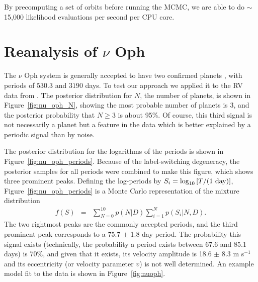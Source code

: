 \documentclass[useAMS,usenatbib]{mn2e}
\begin{document}
By precomputing a set of orbits before running the MCMC, we are able to
do $\sim$ 15,000 likelihood evaluations per second per CPU core.

\section{Reanalysis of $\nu$ Oph}
The $\nu$ Oph system is generally accepted to have two confirmed planets
\citep[e.g.][]{2011AIPC.1331..102Q, 2012PASJ...64..135S, fengji}, with periods
of $530.3$ and $3190$ days. To test our approach we applied it to the RV
data from \citet{2012PASJ...64..135S}.
The posterior distribution for $N$, the number of planets, is shown in
Figure~\ref{fig:nu_oph_N}, showing the most probable number of planets is 3,
and the posterior probability that $N \geq 3$ is about 95\%. Of course, this
third signal is not necessarily a planet but a feature in the data which is
better explained by a periodic signal than by noise.

The posterior distribution for the logarithms of the periods is shown in
Figure~\ref{fig:nu_oph_periods}. Because of the label-switching degeneracy,
the posterior samples for all periods were combined to make this figure, which
shows three prominent peaks. Defining the log-periods by
$S_i =  \log_{10}\left[T/(\textnormal{1 day})\right]$,
Figure~\ref{fig:nu_oph_periods} is a Monte Carlo representation
of the mixture distribution
\begin{eqnarray}
f(S) &=& \sum_{N=0}^{10} p(N | D)\sum_{i=1}^N p(S_i | N, D).
\end{eqnarray}
The two rightmost peaks are the commonly accepted periods, and the third
prominent peak corresponds to a 75.7 $\pm$ 1.8 day period. The probability
this signal exists (technically, the probability a period exists between
67.6 and 85.1 days)
is 70\%, and given that it exists, its velocity amplitude
is 18.6 $\pm$ 8.3 m s$^{-1}$ and its eccentricity (or velocity parameter $v$)
is not well determined.
An example model fit to the data is shown in Figure~\ref{fig:nuoph}.
\end{document}
